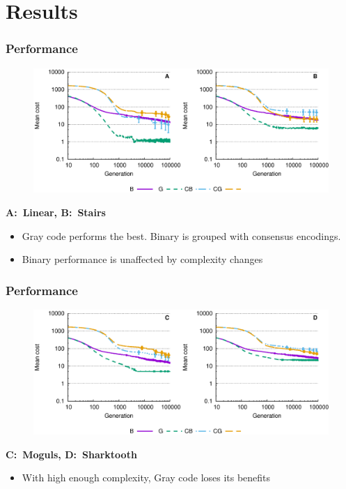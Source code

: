 \documentclass{beamer}
\theoremstyle{plain}
\theoremstyle{definition}
\begin{document}
\section{Results}
   
\begin{frame}
   \frametitle{Performance}
   \vspace{2.5cm}
   \begin{figure}[H]
      \centering
      \includegraphics[trim=0 4cm 0 0,scale=.5]{multievola-b}
   \end{figure}
   \vspace{-3.5cm}
      \textbf{A:\ Linear, B:\ Stairs}
   \begin{itemize}
      \item Gray code performs the best. Binary is grouped with consensus
         encodings.
      \item Binary performance is unaffected by complexity changes
   \end{itemize}
\end{frame}
\begin{frame}
   \frametitle{Performance}
   \vspace{2.5cm}
   \begin{figure}[H]
      \centering
      \includegraphics[trim=0 4cm 0 0,scale=.5]{multievolc-d}
   \end{figure}
   \vspace{-3.5cm}
      \textbf{C:\ Moguls, D:\ Sharktooth}
   \begin{itemize}
      \item With high enough complexity, Gray code loses its benefits
   \end{itemize}
\end{frame}
\end{document}
